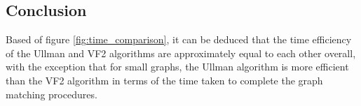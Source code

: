 \subsection{Conclusion}
Based of figure \ref{fig:time_comparison}, it can be deduced that the time efficiency of the Ullman and VF2 algorithms are approximately equal to each other overall,
with the exception that for small graphs, the Ullman algorithm is more efficient than the VF2 algorithm in terms of the time taken to complete the graph matching
procedures.
